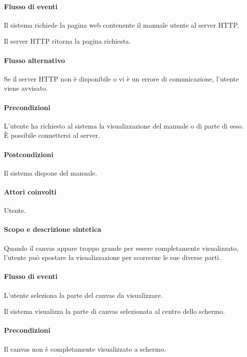 \paragraph{Flusso di eventi}
\begin{elenconumerato}[\textbf{}]{\subsubsecindent}
\item Il sistema richiede la pagina web contenente il manuale utente al server HTTP.
\item Il server HTTP ritorna la pagina richiesta.
\end{elenconumerato}
\paragraph{Flusso alternativo}
Se il server HTTP non \`e disponibile o vi \`e un errore di comunicazione, l'utente viene avvisato.
\paragraph{Precondizioni} L'utente ha richiesto al sistema la visualizzazione del manuale o di parte di esso. \`E possibile connettersi al server.
\paragraph{Postcondizioni} Il sistema dispone del manuale.

\paragraph{Attori coinvolti} Utente.
\paragraph{Scopo e descrizione sintetica}
Quando il canvas appare troppo grande per essere completamente visualizzato, l'utente pu\`o spostare la visualizzazione per scorrerne le sue diverse parti.
\paragraph{Flusso di eventi}
\begin{elenconumerato}[\textbf{}]{\subsubsecindent}
\item L'utente seleziona la parte del canvas da visualizzare.
\item Il sistema visualizza la parte di canvas selezionata al centro dello schermo.
\end{elenconumerato}
\paragraph{Precondizioni} Il canvas non \`e completamente visualizzato a schermo.
